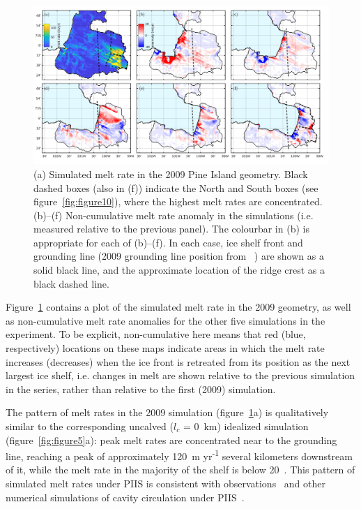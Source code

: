 \documentclass[draft]{agujournal2019}
\begin{document}
\begin{figure}
    \centering
    \includegraphics[width = \textwidth]{../make_figures/plots/figure11_labelled.pdf}
    \caption{(a) Simulated melt rate in the 2009 Pine Island geometry. Black dashed boxes (also in (f)) indicate the North and South boxes (see figure~\ref{fig:figure10}), where the highest melt rates are concentrated. (b)--(f) Non-cumulative melt rate anomaly in the simulations (i.e. measured relative to the previous panel). The colourbar in (b) is appropriate for each of (b)--(f). In each case, ice shelf front and grounding line (2009 grounding line position from ~\cite{Joughin2010GRL}) are shown as a solid black line, and the approximate location of the ridge crest as a black dashed line.} 
    \label{fig:figure11}
\end{figure}


Figure~\ref{fig:figure11} contains a plot of the simulated melt rate in the 2009 geometry, as well as non-cumulative melt rate anomalies for the other five simulations in the experiment. To be explicit, non-cumulative here means that red (blue, respectively) locations on these maps indicate areas in which the melt rate increases (decreases) when the ice front is retreated from its position as the next largest ice shelf, i.e. changes in melt are shown relative to the previous simulation in the series, rather than relative to the first (2009) simulation.

The pattern of melt rates in the 2009 simulation (figure~\ref{fig:figure11}a) is qualitatively similar to the corresponding uncalved ($l_c$ = 0~km) idealized simulation (figure~\ref{fig:figure5}a): peak melt rates are concentrated near to the grounding line, reaching a peak of approximately 120~m yr\textsuperscript{-1} several kilometers downstream of it, while the melt rate in the majority of the shelf is below 20~\mpryr. This pattern of simulated melt rates under PIIS is consistent with observations~\cite{Dutrieux2014Science} and other numerical simulations of cavity circulation under PIIS~\cite{Heimbach2012AnnGlac}.
\end{document}
